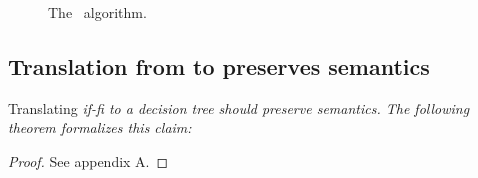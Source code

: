 \documentclass[manuscript,screen,review, 12pt, nonacm]{acmart}
\begin{document}
\begin{figure}[H]
\begin{algorithmic}
\end{algorithmic}
    \caption{The \DTran\ algorithm.}
    \label{dtran}
    \end{figure}    



    \subsection{Translation from \VMinus to \D preserves semantics}
    
    Translating \it{if-fi} to a decision tree should preserve semantics. The
    following theorem formalizes this claim: 

    \begin{proof}
        See appendix A. 
    \end{proof}
\end{document}

